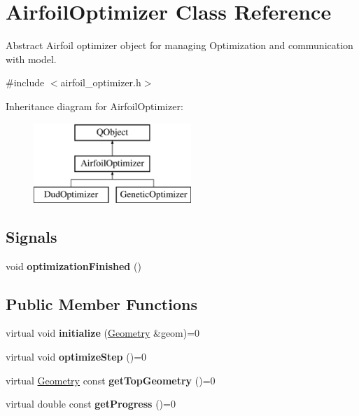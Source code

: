 \hypertarget{class_airfoil_optimizer}{}\section{Airfoil\+Optimizer Class Reference}
\label{class_airfoil_optimizer}


Abstract Airfoil optimizer object for managing Optimization and communication with model.  




{\ttfamily \#include $<$airfoil\+\_\+optimizer.\+h$>$}

Inheritance diagram for Airfoil\+Optimizer\+:\begin{figure}[H]
\begin{center}
\leavevmode
\includegraphics[height=3.000000cm]{class_airfoil_optimizer}
\end{center}
\end{figure}
\subsection*{Signals}
\begin{DoxyCompactItemize}
\item 
\mbox{\label{class_airfoil_optimizer_ab9c9cba16c69c178be6344c7d57794aa}} 
void {\bfseries optimization\+Finished} ()
\end{DoxyCompactItemize}
\subsection*{Public Member Functions}
\begin{DoxyCompactItemize}
\item 
\mbox{\label{class_airfoil_optimizer_a6547cf20afd5820b7ce961e5777d02a6}} 
virtual void {\bfseries initialize} (\hyperlink{class_geometry}{Geometry} \&geom)=0
\item 
\mbox{\label{class_airfoil_optimizer_abe159aa3cef40f5b25ecca8fab1353d1}} 
virtual void {\bfseries optimize\+Step} ()=0
\item 
\mbox{\label{class_airfoil_optimizer_af97435c1a0351b2ed9597a5c522e7c7f}} 
virtual \hyperlink{class_geometry}{Geometry} const {\bfseries get\+Top\+Geometry} ()=0
\item 
\mbox{\label{class_airfoil_optimizer_a5180dad58c1256ca4909e497f1c2b516}} 
virtual double const {\bfseries get\+Progress} ()=0
\end{DoxyCompactItemize}


